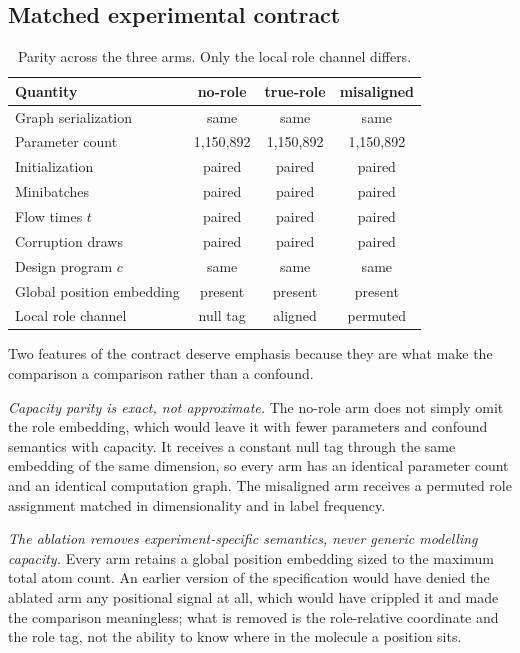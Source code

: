 \documentclass{article}
\begin{document}
\subsection{Matched experimental contract}
\label{app:parity}
\begin{table}[h]
\centering
\caption{Parity across the three arms. Only the local role channel differs.}
\label{tab:parity}
\small
\begin{tabular}{@{}lccc@{}}
\toprule
Quantity & no-role & true-role & misaligned \\
\midrule
Graph serialization & same & same & same \\
Parameter count & 1{,}150{,}892 & 1{,}150{,}892 & 1{,}150{,}892 \\
Initialization & paired & paired & paired \\
Minibatches & paired & paired & paired \\
Flow times $t$ & paired & paired & paired \\
Corruption draws & paired & paired & paired \\
Design program $c$ & same & same & same \\
Global position embedding & present & present & present \\
Local role channel & null tag & aligned & permuted \\
\bottomrule
\end{tabular}
\end{table}

Two features of the contract deserve emphasis because they are what make the comparison a
comparison rather than a confound.

\emph{Capacity parity is exact, not approximate.} The no-role arm does not simply omit the role
embedding, which would leave it with fewer parameters and confound semantics with capacity. It
receives a constant null tag through the same embedding of the same dimension, so every arm has an
identical parameter count and an identical computation graph. The misaligned arm receives a permuted
role assignment matched in dimensionality and in label frequency.

\emph{The ablation removes experiment-specific semantics, never generic modelling capacity.} Every
arm retains a global position embedding sized to the maximum total atom count. An earlier version of
the specification would have denied the ablated arm any positional signal at all, which would have
crippled it and made the comparison meaningless; what is removed is the role-relative coordinate and
the role tag, not the ability to know where in the molecule a position sits.
\end{document}
